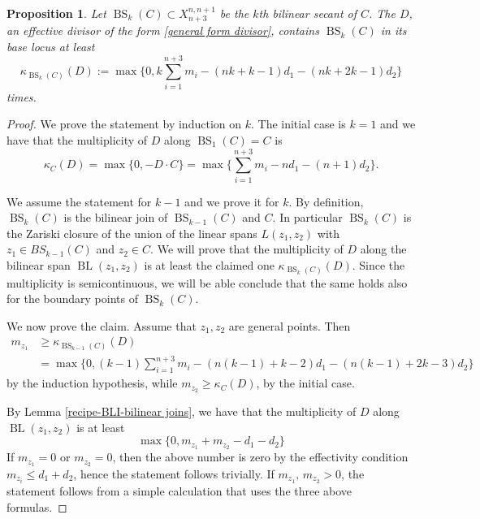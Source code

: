 \documentclass[10pt,a4paper]{amsart}
\newtheorem{proposition}{Proposition}
\newcommand{\BL}{\operatorname{BL}}
\newcommand{\BS}{\operatorname{BS}}
\begin{document}
\begin{proposition} \label{prop-bli-bisecant}
Let $\BS_k(C)\subset X^{n,n+1}_{n+3}$ be the $k$th bilinear secant of $C$. The $D$, an effective divisor of the form \eqref{general form divisor}, contains $\BS_k(C)$ in its base locus at least
$$
\kappa_{\BS_k(C)}(D):=\max\{0,k\sum_{i=1}^{n+3}m_i-(nk+k-1)d_1-(nk+2k-1)d_2\}
$$ times.
\end{proposition}

\begin{proof}
We prove the statement by induction on $k$.
The initial case is $k=1$ and we have that the multiplicity of $D$ along $\BS_1(C)=C$ is 
$$
\kappa_C(D)=\max\{0,-D\cdot C\}= \max\{\sum_{i=1}^{n+3}m_i-nd_1-(n+1)d_2\}.
$$

We assume the statement for $k-1$ and we prove it for $k$.
By definition, $\BS_k(C)$ is the bilinear join of $\BS_{k-1}(C)$ and $C$. In particular  $\BS_k(C)$ is the Zariski closure of the union of the linear spans $L(z_1,z_2)$ with $z_1\in BS_{k-1}(C)$ and $z_2\in C$.
We will prove that the multiplicity of $D$ along the bilinear span $\BL(z_1,z_2)$ is at least the claimed one $\kappa_{\BS_k(C)}(D)$. Since the multiplicity is semicontinuous, we will be able conclude that the same holds also for the boundary points of $\BS_k(C)$.

We now prove the claim.
Assume that $z_1,z_2$ are general points. 
Then 
\begin{align*} 
m_{z_1}&\ge\kappa_{\BS_{k-1}(C)}(D)\\
&=\max\{0,(k-1)\sum_{i=1}^{n+3}m_i-(n(k-1)+k-2)d_1-(n(k-1)+2k-3)d_2\}
\end{align*}
by the induction hypothesis, while 
$m_{z_2}\ge \kappa_C(D)$, by the initial case.


By Lemma \ref{recipe-BLI-bilinear joins}, we have that the multiplicity of $D$ along $\BL(z_1,z_2)$ is at least 
$$
\max\{0,m_{z_1}+m_{z_2}-d_1-d_2\}
$$
%
 If $m_{z_1}=0$ or $m_{z_2}=0$, then the above number is zero by the effectivity condition $m_{z_i}\le d_1+d_2$, hence the statement follows trivially. If $m_{z_1}, \, m_{z_2}>0$, the statement follows from a simple calculation that uses the three above formulas. \end{proof}
\end{document}
